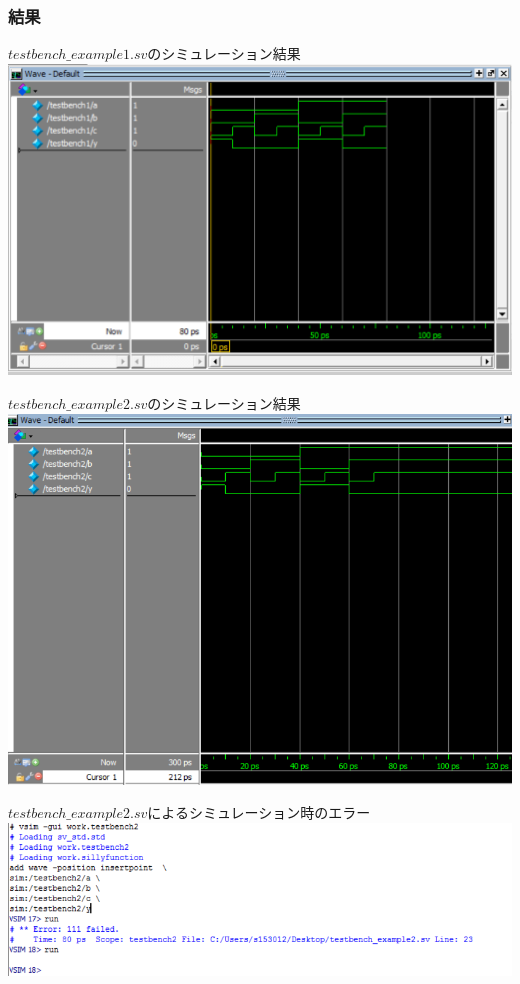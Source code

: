 \documentclass[a4paper]{jarticle}
\begin{document}
\subsubsection{結果}
\begin{center}
	$testbench\_example1.sv$のシミュレーション結果
	\includegraphics[width=15cm]{1-m-1.PNG}
\end{center}
\begin{center}
	$testbench\_example2.sv$のシミュレーション結果
	\includegraphics[width=15cm]{1-m-2.PNG}
\end{center}
\begin{center}
	$testbench\_example2.sv$によるシミュレーション時のエラー
	\includegraphics[width=15cm]{testbench2error.PNG}
\end{center}
\end{document}
